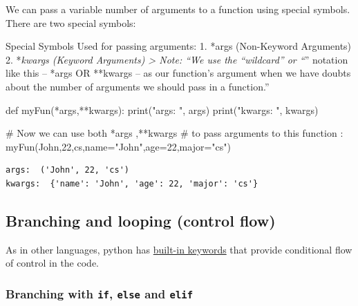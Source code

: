 \documentclass[
  letterpaper,
  DIV=11,
  numbers=noendperiod]{scrreprt}
\newenvironment{Shaded}{\begin{snugshade}}{\end{snugshade}}
\newcommand{\BuiltInTok}[1]{\textcolor[rgb]{0.00,0.23,0.31}{#1}}
\newcommand{\CommentTok}[1]{\textcolor[rgb]{0.37,0.37,0.37}{#1}}
\newcommand{\DecValTok}[1]{\textcolor[rgb]{0.68,0.00,0.00}{#1}}
\newcommand{\KeywordTok}[1]{\textcolor[rgb]{0.00,0.23,0.31}{#1}}
\newcommand{\NormalTok}[1]{\textcolor[rgb]{0.00,0.23,0.31}{#1}}
\newcommand{\OperatorTok}[1]{\textcolor[rgb]{0.37,0.37,0.37}{#1}}
\newcommand{\StringTok}[1]{\textcolor[rgb]{0.13,0.47,0.30}{#1}}
\begin{document}
We can pass a variable number of arguments to a function using special
symbols. There are two special symbols:

Special Symbols Used for passing arguments: 1. *args (Non-Keyword
Arguments) 2. *\emph{kwargs (Keyword Arguments) \textgreater{} Note:
``We use the ``wildcard'' or ``}'' notation like this -- *args OR
**kwargs -- as our function's argument when we have doubts about the
number of arguments we should pass in a function.''

\begin{Shaded}
\begin{Highlighting}[]
\KeywordTok{def}\NormalTok{ myFun(}\OperatorTok{*}\NormalTok{args,}\OperatorTok{**}\NormalTok{kwargs):}
    \BuiltInTok{print}\NormalTok{(}\StringTok{"args: "}\NormalTok{, args)}
    \BuiltInTok{print}\NormalTok{(}\StringTok{"kwargs: "}\NormalTok{, kwargs)}
 
 
\CommentTok{\# Now we can use both *args ,**kwargs}
\CommentTok{\# to pass arguments to this function :}
\NormalTok{myFun(}\StringTok{\textquotesingle{}John\textquotesingle{}}\NormalTok{,}\DecValTok{22}\NormalTok{,}\StringTok{\textquotesingle{}cs\textquotesingle{}}\NormalTok{,name}\OperatorTok{=}\StringTok{"John"}\NormalTok{,age}\OperatorTok{=}\DecValTok{22}\NormalTok{,major}\OperatorTok{=}\StringTok{"cs"}\NormalTok{)}
\end{Highlighting}
\end{Shaded}

\begin{verbatim}
args:  ('John', 22, 'cs')
kwargs:  {'name': 'John', 'age': 22, 'major': 'cs'}
\end{verbatim}

\hypertarget{branching-and-looping-control-flow}{%
\subsection{Branching and looping (control
flow)}\label{branching-and-looping-control-flow}}

As in other languages, python has
\href{https://docs.python.org/3/tutorial/controlflow.html}{built-in
keywords} that provide conditional flow of control in the code.

\hypertarget{branching-with-if-else-and-elif}{%
\subsubsection{\texorpdfstring{Branching with \texttt{if}, \texttt{else}
and
\texttt{elif}}{Branching with if, else and elif}}\label{branching-with-if-else-and-elif}}
\end{document}
